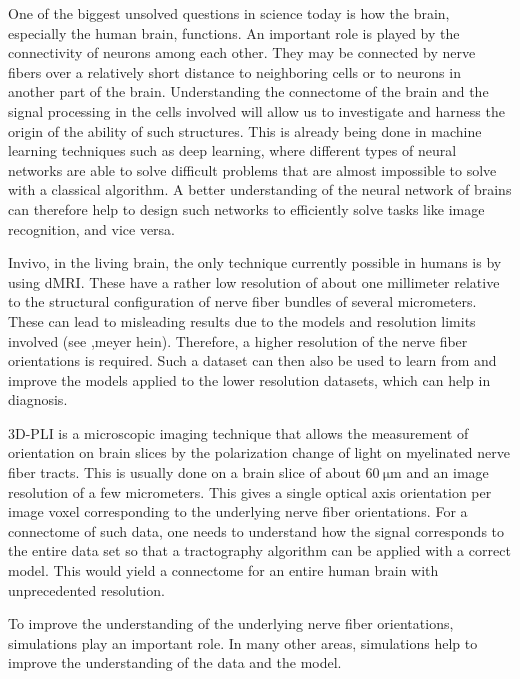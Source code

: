 % 
One of the biggest unsolved questions in science today is how the brain, especially the human brain, functions.
An important role is played by the connectivity of neurons among each other.
They may be connected by nerve fibers over a relatively short distance to neighboring cells or to neurons in another part of the brain.
Understanding the connectome of the brain and the signal processing in the cells involved will allow us to investigate and harness the origin of the ability of such structures.
This is already being done in machine learning techniques such as deep learning, where different types of neural networks are able to solve difficult problems that are almost impossible to solve with a classical algorithm.
A better understanding of the neural network of brains can therefore help to design such networks to efficiently solve tasks like image recognition, and vice versa.
\par
% 
Invivo, \ie{} in the living brain, the only technique currently possible in humans is by using \ac{dMRI}.
These have a rather low resolution of about one millimeter relative to the structural configuration of nerve fiber bundles of several micrometers.
These can lead to misleading results due to the models and resolution limits involved (see ,meyer hein).
Therefore, a higher resolution of the nerve fiber orientations is required.
Such a dataset can then also be used to learn from and improve the models applied to the lower resolution datasets, which can help in diagnosis.
\par
% 
\ac{3D-PLI} is a microscopic imaging technique that allows the measurement of orientation on brain slices by the polarization change of light on myelinated nerve fiber tracts.
This is usually done on a brain slice of about $\SI{60}{\micro\meter}$ and an image resolution of a few micrometers.
This gives a single optical axis orientation per image voxel corresponding to the underlying nerve fiber orientations.
For a connectome of such data, one needs to understand how the signal corresponds to the entire data set so that a tractography algorithm can be applied with a correct model.
This would yield a connectome for an entire human brain with unprecedented resolution.
\par
% 
To improve the understanding of the underlying nerve fiber orientations, simulations play an important role.
In many other areas, simulations help to improve the understanding of the data and the model.
